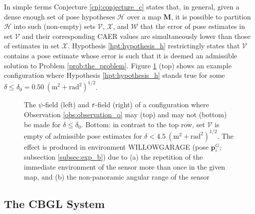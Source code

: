 In simple terms Conjecture \ref{cnj:conjecture_c} states that, in general,
given a dense enough set of pose hypotheses $\mathcal{H}$ over a map $\bm{M}$,
it is possible to partition $\mathcal{H}$ into such (non-empty) sets
$\mathcal{V}$, $\mathcal{X}$, and $\mathcal{W}$ that the error of pose
estimates in set $\mathcal{V}$ and their corresponding CAER values are
simultaneously lower than those of estimates in set $\mathcal{X}$. Hypothesis
\ref{hpt:hypothesis_h} restrictingly states that $\mathcal{V}$ contains
a pose estimate whose error is such that it is deemed an admissible solution to
Problem \ref{prob:the_problem}. Figure \ref{fig:h_and_h_not_fig} (top) shows
an example configuration where Hypothesis \ref{hpt:hypothesis_h}
stands true for some $ \delta \leq \delta_0 = 0.50 \ (\text{m}^2 + \text{rad}^2)^{1/2}$.

\begin{figure}\vspace{-0.2cm}
  
  \vspace{0.3cm}
  \caption{\small The $\psi$-field (left) and \texttt{r}-field (right) of a
           configuration where Observation \ref{obs:observation_o} may (top)
           and may not (bottom) be made for $\delta \leq \delta_0$. Bottom:
           in contrast to the top row, set $\mathcal{V}$ is empty of admissible
           pose estimates for $\delta < 4.5 \ (\text{m}^2 +
           \text{rad}^2)^{1/2}$. The effect is produced in environment
           WILLOWGARAGE (pose $\bm{p}_{i}^G$; subsection \ref{subsec:exp_b})
           due to (a) the repetition of the immediate environment of the sensor
           more than once in the given map, and (b) the non-panoramic angular
           range of the sensor}
  \vspace{-0.5cm}
  \label{fig:h_and_h_not_fig}
\end{figure}


\subsection{The CBGL System}

